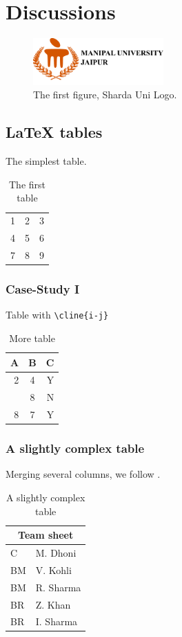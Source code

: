\documentclass[11pt, a4paper]{article}
\begin{document}
\section{Discussions}

\begin{figure}[b]
\includegraphics[scale=0.2, width = 5cm, angle=270]{fig/logo} %
\caption{The first figure, Sharda Uni Logo.}
\end{figure}

\subsection{\LaTeX{} tables}
The simplest table.

\begin{table}[t]
\begin{tabular}{lcr}
 1 & 2 & 3 \\
  4 & 5 & 6 \\
  7 & 8 & 9 \\
\end{tabular}
\caption{The first table}
\end{table}

\subsubsection{Case-Study I}

Table with \verb|\cline{i-j}|
\begin{table}[t]
\begin{tabular}{|r|c|r|}
  \hline
  A & B & C\\
  \hline
  2 & 4 & Y\\ \cline{2-3}
   & 8 & N  \\
  \hline \hline
  8 &  7 & Y \\
  \hline
\end{tabular}
\caption{More table}
\end{table}
\subsubsection{A slightly complex table}

Merging several columns, we follow \cite{lamport94}.
\begin{table}[t]
\begin{tabular}{ |l|l| }
  \hline
  \multicolumn{2}{|c|}{Team sheet} \\
  \hline
  C  & M. Dhoni \\
  BM & V. Kohli \\
  BM & R. Sharma \\
  BR & Z. Khan \\
  BR & I. Sharma \\
  \hline
\end{tabular}
\caption{A slightly complex table}
\end{table}
\end{document}
